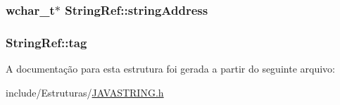 \subsubsection[{string\+Address}]{\setlength{\rightskip}{0pt plus 5cm}wchar\+\_\+t$\ast$ String\+Ref\+::string\+Address}\label{struct_string_ref_ae38ec52f1790f3c3cfb82c0ebcf72d2d}
\hypertarget{struct_string_ref_a4d039a824a7ac849742acb2cbbfce77d}{}
\subsubsection[{tag}]{ String\+Ref\+::tag}\label{struct_string_ref_a4d039a824a7ac849742acb2cbbfce77d}


A documentação para esta estrutura foi gerada a partir do seguinte arquivo\+:\begin{DoxyCompactItemize}
\item 
include/\+Estruturas/\hyperlink{_j_a_v_a_s_t_r_i_n_g_8h}{J\+A\+V\+A\+S\+T\+R\+I\+N\+G.\+h}\end{DoxyCompactItemize}
